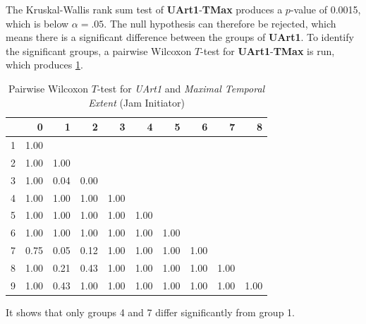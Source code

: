The Kruskal-Wallis rank sum test of \textbf{UArt1}-\textbf{TMax} produces a $p$-value of 0.0015, which is below $\alpha=.05$. The null hypothesis can therefore be rejected, which means there is a significant difference between the groups of \textbf{UArt1}. To identify the significant groups, a pairwise Wilcoxon $T$-test for \textbf{UArt1}-\textbf{TMax} is run, which produces \cref{tbl:wilcoxon_baysis_initiator_UArt_TMax}. 
\begin{table}[ht]
	\tiny
	\centering
    \begin{tabular}{rrrrrrrrrr}
        \toprule
        & 0 & 1 & 2 & 3 & 4 & 5 & 6 & 7 & 8 \\ 
        \midrule
        1 & 1.00 &  &  &  &  &  &  &  &  \\ 
        2 & 1.00 & 1.00 &  &  &  &  &  &  &  \\ 
        3 & 1.00 & 0.04 & 0.00 &  &  &  &  &  &  \\ 
        4 & 1.00 & 1.00 & 1.00 & 1.00 &  &  &  &  &  \\ 
        5 & 1.00 & 1.00 & 1.00 & 1.00 & 1.00 &  &  &  &  \\ 
        6 & 1.00 & 1.00 & 1.00 & 1.00 & 1.00 & 1.00 &  &  &  \\ 
        7 & 0.75 & 0.05 & 0.12 & 1.00 & 1.00 & 1.00 & 1.00 &  &  \\ 
        8 & 1.00 & 0.21 & 0.43 & 1.00 & 1.00 & 1.00 & 1.00 & 1.00 &  \\ 
        9 & 1.00 & 0.43 & 1.00 & 1.00 & 1.00 & 1.00 & 1.00 & 1.00 & 1.00 \\ 
        \bottomrule
      \end{tabular}
    \caption{Pairwise Wilcoxon $T$-test for \textit{UArt1} and \textit{Maximal Temporal Extent} (Jam Initiator)}
    \label{tbl:wilcoxon_baysis_initiator_UArt_TMax}
\end{table}
It shows that only groups 4 and 7 differ significantly from group 1. 

